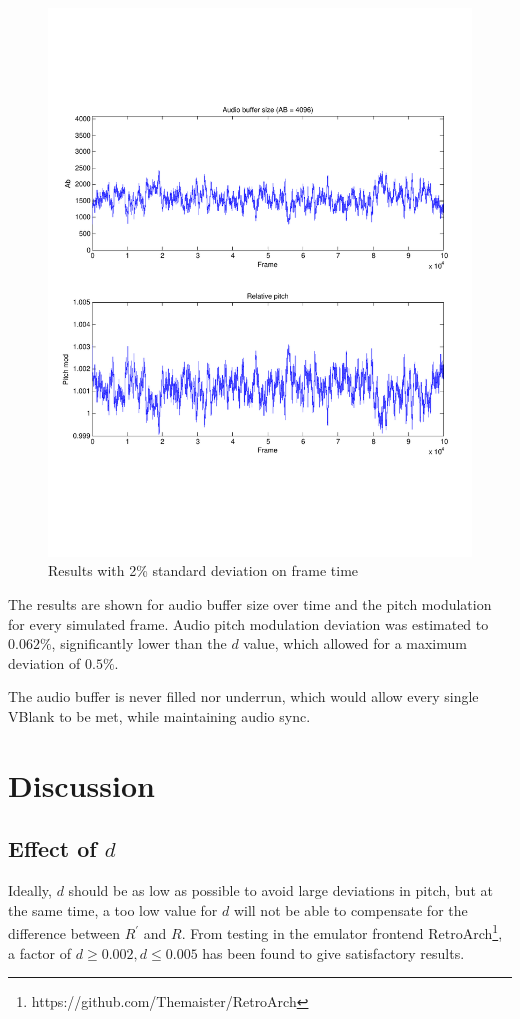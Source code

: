 \documentclass[11pt, a4paper]{article}
\begin{document}
\begin{figure}[H]
\centering
\includegraphics[width=12cm]{ratecontrol-data.pdf}
\caption{Results with 2\% standard deviation on frame time}
\end{figure}

The results are shown for audio buffer size over time and the pitch modulation for every simulated frame. Audio pitch modulation deviation was estimated to $0.062\%$, significantly lower than the $d$ value, which allowed for a maximum deviation of $0.5\%$.

The audio buffer is never filled nor underrun, which would allow every single VBlank to be met, while maintaining audio sync.

\section{Discussion}

\subsection{Effect of $d$}
Ideally, $d$ should be as low as possible to avoid large deviations in pitch, but at the same time, a too low value for $d$ will not be able to compensate for the difference between $R^{'}$ and $R$.
From testing in the emulator frontend RetroArch\footnote{https://github.com/Themaister/RetroArch}, a factor of $d \geq 0.002, d \leq 0.005$ has been found to give satisfactory results.
\end{document}
